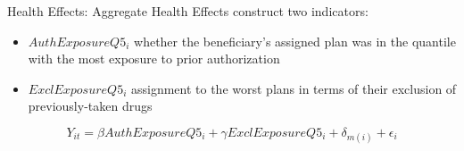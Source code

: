 \begin{frame}{Health Effects: Aggregate Health Effects}
    construct two indicators:
    \begin{itemize}
        \item $AuthExposureQ5_i$ whether the beneficiary’s assigned plan was in the quantile with the most exposure to prior authorization
        \item $ExclExposureQ5_i$ assignment to the worst plans in terms of their exclusion of previously-taken drugs
    \end{itemize}
    $$Y_{it}=\beta AuthExposureQ5_i + \gamma ExclExposureQ5_i + \delta_{m(i)} + \epsilon_{i} $$
    
\end{frame}